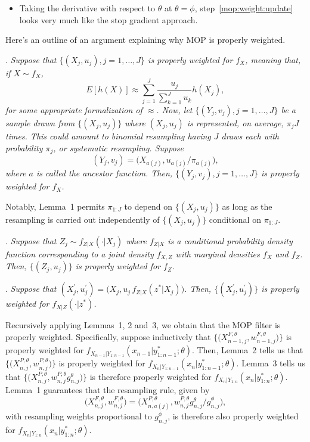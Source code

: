 \documentclass[12p]{article}
\begin{document}
\begin{itemize}
  \item Taking the derivative with respect to $\theta$ at $\theta=\phi$, step~\ref{mop:weight:update} looks very much like the stop gradient approach.

  \end{itemize}

Here's an outline of an argument explaining why MOP is properly weighted.

. {\it
Suppose that $\{(X_j,u_j),j=1,\dots,J\}$ is properly weighted for $f_X$, meaning that, if $X\sim f_X$,
\[
E[h(X)] \approx \sum_{j=1}^J \frac{u_j}{\sum_{k=1}^J u_k} h(X_j),
\]
for some appropriate formalization of $\approx$. Now, let $\{(Y_j,v_j),j=1,\dots,J\}$ be a sample drawn from $\{(X_j,u_j)\}$ where $(X_j,u_j)$ is represented, on average, $\pi_j J$ times. This could amount to binomial resampling having $J$ draws each with probability $\pi_j$, or systematic resampling. Suppose
\[
(Y_j,v_j) = \big(X_{a(j)},u_{a(j)}/\pi_{a(j)}\big),
\]
where $a$ is called the ancestor function. Then, $\{(Y_j,v_j),j=1,\dots,J\}$ is properly weighted for $f_X$.
}

Notably, Lemma~1 permits $\pi_{1:J}$ to depend on $\{(X_j,u_j)\}$ as long as the resampling is carried out independently of $\{(X_j,u_j)\}$ conditional on $\pi_{1:J}$.

. {\it
  Suppose that $Z_j \sim f_{Z|X}(\cdot | X_j)$ where $f_{Z|X}$ is a conditional probability density function corresponding to a joint density $f_{X,Z}$ with marginal densities $f_X$ and $f_Z$. Then, $\{(Z_j,u_j)\}$ is properly weighted for $f_Z$.
}

. {\it
Suppose that $(X^\prime_j,u^\prime_j) = \big(X_j,u_j\, f_{Z|X}(z^*|X_j)\big)$. Then, $\{(X^\prime_j,u^\prime_j)\}$ is properly weighted for $f_{X|Z}(\cdot | z^*)$.
}

Recursively applying Lemmas~1, 2 and~3, we obtain that 
the MOP filter is properly weighted.
Specifically, suppose inductively that $\big\{\big(X^{F,\theta}_{n-1,j},w^{F,\theta}_{n-1,j}\big)\big\}$ is properly weighted for $f_{X_{n-1}|Y_{1:n-1}}(x_{n-1}|y^*_{1:n-1};\theta)$.
Then, Lemma~2 tells us that $\big\{\big(X^{P,\theta}_{n,j},w^{P,\theta}_{n,j}\big)\big\}$ is properly weighted for $f_{X_{n}|Y_{1:n-1}}(x_{n}|y^*_{1:n-1};\theta)$.
Lemma~3 tells us that $\big\{\big(X^{P,\theta}_{n,j},w^{P,\theta}_{n,j} g^\theta_{n,j} \big)\big\}$ is therefore properly weighted for  $f_{X_{n}|Y_{1:n}}(x_{n}|y^*_{1:n};\theta)$.
Lemma~1 guarantees that the resampling rule, given by 
\[
\big(X^{F,\theta}_{n,j},w^{F,\theta}_{n,j}\big) = \big(X^{P,\theta}_{n,a(j)}, w^{P,\theta}_{n,j} g^\theta_{n,j}\big/ g^\phi_{n,j}\big),
\]
with resampling weights proportional to $g^\phi_{n,j}$, is therefore also properly weighted for $f_{X_{n}|Y_{1:n}}(x_{n}|y^*_{1:n};\theta)$.
\end{document}
